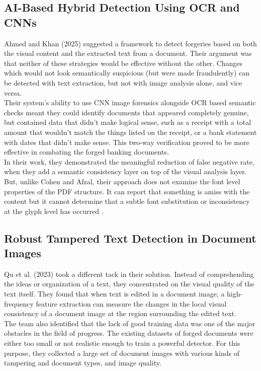 \subsection{AI-Based Hybrid Detection Using OCR and CNNs}

\noindent Ahmed and Khan (2025) suggested a framework to detect forgeries based on both the visual content and the extracted text from a document. Their argument was that neither of these strategies would be effective without the other. Changes which would not look semantically suspicious (but were made fraudulently) can be detected with text extraction, but not with image analysis alone, and vice versa.\\

\noindent Their system's ability to use CNN image forensics alongside OCR based semantic checks meant they could identify documents that appeared completely genuine, but contained data that didn't make logical sense, such as a receipt with a total amount that wouldn't match the things listed on the receipt, or a bank statement with dates that didn't make sense. This two-way verification proved to be more effective in combating the forged banking documents.\\

\noindent In their work, they demonstrated the meaningful reduction of false negative rate, when they add a semantic consistency layer on top of the visual analysis layer. But, unlike Cohen and Afzal, their approach does not examine the font level properties of the PDF structure. It can report that something is amiss with the content but it cannot determine that a subtle font substitution or inconsistency at the glyph level has occurred \cite{Ahmed2025AIForgeries}.\\

\subsection{Robust Tampered Text Detection in Document Images}

\noindent Qu et al. (2023) took a different tack in their solution. Instead of comprehending the ideas or organization of a text, they concentrated on the visual quality of the text itself. They found that when text is edited in a document image, a high-frequency feature extraction can measure the changes in the local visual consistency of a document image at the region surrounding the edited text.\\

\noindent The team also identified that the lack of good training data was one of the major obstacles in the field of progress. The existing datasets of forged documents were either too small or not realistic enough to train a powerful detector. For this purpose, they collected a large set of document images with various kinds of tampering and document types, and image quality.\\

